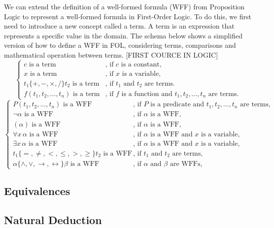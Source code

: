 We can extend the definition of a well-formed formula (WFF) from Proposition Logic to represent a well-formed formula in First-Order Logic. To do this, we first need to introduce a new concept called a term. A term is an expression that represents a specific value in the domain. The schema below shows a simplified version of how to define a WFF in FOL, considering terms, comparisons and mathematical operation between terms.
[FIRST COURCE IN LOGIC]
\[
\left\{
\begin{array}{ll}
c \text{ is a term} & \text{, if } c \text{ is a constant,} \\
x \text{ is a term} & \text{, if } x \text{ is a variable,} \\
t_1 \mathbin{\{+, -, \times, /\}} t_2 \text{ is a term} & \text{, if } t_1 \text{ and } t_2 \text{ are terms.} \\
f(t_1, t_2, \dots, t_n) \text{ is a term} & \text{, if } f \text{ is a function and } t_1, t_2, \dots, t_n \text{ are terms.}
\end{array}
\right.
\]
\[
\left\{
\begin{array}{ll}
P(t_1, t_2, \dots, t_n) \text{ is a WFF} & \text{, if } P \text{ is a predicate and } t_1, t_2, \dots, t_n \text{ are terms,} \\
\neg \alpha \text{ is a WFF} & \text{, if } \alpha \text{ is a WFF,} \\
(\alpha) \text{ is a WFF} & \text{, if } \alpha \text{ is a WFF,} \\
\forall x \, \alpha \text{ is a WFF} & \text{, if } \alpha \text{ is a WFF and } x \text{ is a variable,} \\
\exists x \, \alpha \text{ is a WFF} & \text{, if } \alpha \text{ is a WFF and } x \text{ is a variable,} \\
t_1 \mathbin{\{=, \neq, <, \leq, >, \geq\}} t_2 \text{ is a WFF} & \text{, if } t_1 \text{ and } t_2 \text{ are terms,} \\
\alpha \mathbin{\{\land, \lor, \rightarrow, \leftrightarrow\}} \beta \text{ is a WFF} & \text{, if } \alpha \text{ and } \beta \text{ are WFFs,} 
\end{array}
\right.
\]

\subsection{Equivalences}
\subsection{Natural Deduction}



